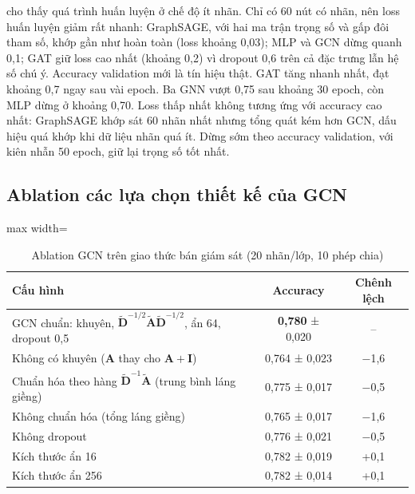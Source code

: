  cho thấy quá trình huấn luyện ở chế độ ít nhãn. Chỉ có 60 nút có nhãn, nên loss huấn luyện giảm rất nhanh: GraphSAGE, với hai ma trận trọng số và gấp đôi tham số, khớp gần như hoàn toàn (loss khoảng 0,03); MLP và GCN dừng quanh 0,1; GAT giữ loss cao nhất (khoảng 0,2) vì dropout 0,6 trên cả đặc trưng lẫn hệ số chú ý. Accuracy validation mới là tín hiệu thật. GAT tăng nhanh nhất, đạt khoảng 0,7 ngay sau vài epoch. Ba GNN vượt 0,75 sau khoảng 30 epoch, còn MLP dừng ở khoảng 0,70. Loss thấp nhất không tương ứng với accuracy cao nhất: GraphSAGE khớp sát 60 nhãn nhất nhưng tổng quát kém hơn GCN, dấu hiệu quá khớp khi dữ liệu nhãn quá ít. Dừng sớm theo accuracy validation, với kiên nhẫn 50 epoch, giữ lại trọng số tốt nhất.

\subsection{Ablation các lựa chọn thiết kế của GCN}

\begin{table}[H]
\centering
\caption{Ablation GCN trên giao thức bán giám sát (20 nhãn/lớp, 10 phép chia)}
\label{tab:ch6-ablation}
\small
\begin{adjustbox}{max width=\linewidth}
\begin{tabular}{@{}lcc@{}}
\toprule
\textbf{Cấu hình} & \textbf{Accuracy} & \textbf{Chênh lệch} \\
\midrule
GCN chuẩn: khuyên, $\tilde{\mathbf D}^{-1/2}\tilde{\mathbf A}\tilde{\mathbf D}^{-1/2}$, ẩn 64, dropout 0,5 & \textbf{0,780} ± 0,020 & -- \\
Không có khuyên ($\mathbf A$ thay cho $\mathbf A+\mathbf I$) & 0,764 ± 0,023 & −1,6 \\
Chuẩn hóa theo hàng $\tilde{\mathbf D}^{-1}\tilde{\mathbf A}$ (trung bình láng giềng) & 0,775 ± 0,017 & −0,5 \\
Không chuẩn hóa (tổng láng giềng) & 0,765 ± 0,017 & −1,6 \\
Không dropout & 0,776 ± 0,021 & −0,5 \\
Kích thước ẩn 16 & 0,782 ± 0,019 & +0,1 \\
Kích thước ẩn 256 & 0,782 ± 0,014 & +0,1 \\
\bottomrule
\end{tabular}
\end{adjustbox}
\end{table}

